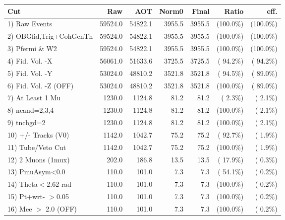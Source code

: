  \begin{table}[h!]\centering
 \begin{tabular}{||l||r|r|r|r|r|r||}
 \hline
 \hline
 Cut & Raw & AOT & Norm0 & Final & Ratio & eff.       \\
 \hline
  1) Raw Events           &      59524.0 &      54822.1 &       3955.5 &       3955.5 & (100.0\%) & (100.0\%) \\
  2) OBGfid,Trig+CohGenTh &      59524.0 &      54822.1 &       3955.5 &       3955.5 & (100.0\%) & (100.0\%) \\
  3) Pfermi \& W2         &      59524.0 &      54822.1 &       3955.5 &       3955.5 & (100.0\%) & (100.0\%) \\
  4) Fid. Vol. -X         &      56061.0 &      51633.6 &       3725.5 &       3725.5 & ( 94.2\%) & ( 94.2\%) \\
  5) Fid. Vol. -Y         &      53024.0 &      48810.2 &       3521.8 &       3521.8 & ( 94.5\%) & ( 89.0\%) \\
  6) Fid. Vol. -Z (OFF)   &      53024.0 &      48810.2 &       3521.8 &       3521.8 & (100.0\%) & ( 89.0\%) \\
  7) At Least 1 Mu        &       1230.0 &       1124.8 &         81.2 &         81.2 & (  2.3\%) & (  2.1\%) \\
  8) ncand=2,3,4          &       1230.0 &       1124.8 &         81.2 &         81.2 & (100.0\%) & (  2.1\%) \\
  9) tnchgd=2             &       1230.0 &       1124.8 &         81.2 &         81.2 & (100.0\%) & (  2.1\%) \\
 10) +/- Tracks (V0)      &       1142.0 &       1042.7 &         75.2 &         75.2 & ( 92.7\%) & (  1.9\%) \\
 11) Tube/Veto Cut        &       1142.0 &       1042.7 &         75.2 &         75.2 & (100.0\%) & (  1.9\%) \\
 12) 2 Muons (1mux)       &        202.0 &        186.8 &         13.5 &         13.5 & ( 17.9\%) & (  0.3\%) \\
 13) PmuAsym<0.0          &        110.0 &        101.0 &          7.3 &          7.3 & ( 54.1\%) & (  0.2\%) \\
 14) Theta$<$2.62 rad     &        110.0 &        101.0 &          7.3 &          7.3 & (100.0\%) & (  0.2\%) \\
 15) Pt+wrt- $>$0.05      &        110.0 &        101.0 &          7.3 &          7.3 & (100.0\%) & (  0.2\%) \\
 16) Mee $>$ 2.0  (OFF)   &        110.0 &        101.0 &          7.3 &          7.3 & (100.0\%) & (  0.2\%) \\

\end{tabular}
\end{table}
